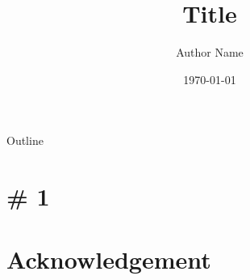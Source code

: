 \documentclass[unicode,12pt]{beamer}
\title{Title}
\author{Author Name}
\date{\today}
\institute{Institute}
\begin{document}
\maketitle

\usebackgroundtemplate{}
\logo{}

\begin{frame}{Outline}
    \tableofcontents
\end{frame}

\section{\# 1}


\section*{Acknowledgement}

\end{document}
